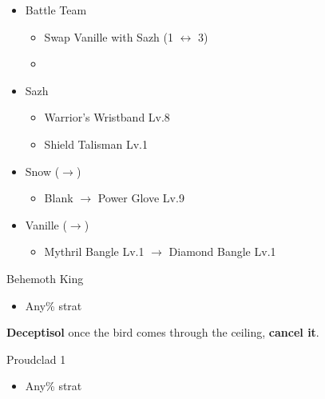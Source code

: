 \begin{menu}
\begin{itemize}
\begin{itemize}
\begin{itemize}
				\end{itemize}								
		\end{itemize}
		\paradigm
		\begin{itemize}
			\item Battle Team
				\begin{itemize}
					\item Swap Vanille with Sazh (1 $\leftrightarrow$ 3)
					\item {}%
				  {\paradigmline{\com}{(\com)}{\med}}%
			      {\paradigmline[4]{\com}{(\com)}{(\com)}}%
			      {\paradigmline{\syn}{\sen}{(\sab)}}%
			      {\paradigmline{[\syn]}{(\rav)}{(\med)}}%
			      {\paradigmline{\rav}{(\rav)}{[\med]}}%
			      {\paradigmline{\rav}{[\rav]}{\rav}}%
				\end{itemize}
		\end{itemize}
		\equip
		\begin{itemize}
			\item Sazh
				\begin{itemize}
					\item Warrior's Wristband Lv.8
					\item Shield Talisman Lv.1
				\end{itemize}
			\item Snow ($\rightarrow$)
				\begin{itemize}
					\item Blank $\rightarrow$ Power Glove Lv.9
				\end{itemize}
			\item Vanille ($\rightarrow$)
				\begin{itemize}
					\item Mythril Bangle Lv.1 $\rightarrow$ Diamond Bangle Lv.1
				\end{itemize}
		\end{itemize}
	\end{itemize}
\end{menu}

\begin{battle}{Behemoth King}
	\begin{itemize}
		\item Any\% strat
	\end{itemize}
\end{battle}

\textbf{Deceptisol} once the bird comes through the ceiling, \textbf{cancel it}.

\begin{battle}{Proudclad 1}
	\begin{itemize}
		\item Any\% strat
	\end{itemize}
\end{battle}

